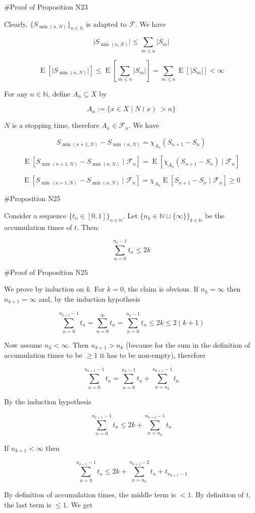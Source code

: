 \documentclass[a4paper]{article}
\DeclareMathOperator{\E}{E}
\newcommand{\Nats}{\mathbb{N}}
\newcommand{\Sq}[2]{\{#1\}_{#2 \in \Nats}}
\newcommand{\Sqn}[1]{\Sq{#1}{n}}
\newcommand{\Abs}[1]{\lvert #1 \rvert}
\newcommand{\F}{\mathcal{F}}
\begin{document}
\#Proof of Proposition N23

Clearly, ${\Sqn{S_{\min(n,N)}}}$ is adapted to ${\F}$. We have

$$\Abs{S_{\min(n,N)}} \leq \sum_{m \leq n} \Abs{S_m}$$

$$\E[\Abs{S_{\min(n,N)}}] \leq \E[\sum_{m \leq n} \Abs{S_m}] = \sum_{m \leq n} \E[\Abs{S_m}] < \infty$$

For any ${n \in \Nats}$, define ${A_n \subseteq X}$ by

$$A_n:=\{x \in X \mid N(x)\ > n\}$$

${N}$ is a stopping time, therefore ${A_n \in \F_n}$. We have 

$${S_{\min(n+1,N)} - S_{\min(n,N)} = \chi_{A_n} (S_{n+1} - S_n)}$$

$${\E[S_{\min(n+1,N)} - S_{\min(n,N)} \mid \F_n] = \E[\chi_{A_n} (S_{n+1} - S_n) \mid \F_n]}$$

$${\E[S_{\min(n+1,N)} - S_{\min(n,N)} \mid \F_n] = \chi_{A_n} \E[ S_{n+1} - S_n \mid \F_n] \geq 0}$$

\#Proposition N25

Consider a sequence ${\{t_n \in [0,1]\}_{n \in \Nats}}$. Let ${\{n_k \in \Nats \sqcup \{\infty\}\}_{k \in \Nats}}$ be the accumulation times of ${t}$. Then:

$$\sum_{n = 0}^{n_k - 1} t_n \leq 2k$$

\#Proof of Proposition N25

We prove by induction on ${k}$. For ${k = 0}$, the claim is obvious. If ${n_k = \infty}$ then ${n_{k+1}=\infty}$ and, by the induction hypothesis

$$\sum_{n = 0}^{n_{k+1} - 1} t_n = \sum_{n = 0}^{\infty} t_n = \sum_{n = 0}^{n_k - 1} t_n \leq 2k \leq 2(k+1)$$

Now assume ${n_k < \infty}$. Then ${n_{k+1} > n_k}$ (because for the sum in the definition of accumulation times to be ${\geq 1}$ it has to be non-empty), therefore

$$\sum_{n = 0}^{n_{k+1} - 1} t_n = \sum_{n = 0}^{n_k - 1} t_n + \sum_{n = n_k}^{n_{k+1} - 1} t_n$$

By the induction hypothesis

$$\sum_{n = 0}^{n_{k+1} - 1} t_n \leq 2k + \sum_{n = n_k}^{n_{k+1} - 1} t_n$$

If ${n_{k+1} < \infty}$ then

$$\sum_{n = 0}^{n_{k+1} - 1} t_n \leq 2k + \sum_{n = n_k}^{n_{k+1} - 2} t_n + t_{n_{k+1}-1}$$

By definition of accumulation times, the middle term is ${< 1}$. By definition of ${t}$, the last term is ${\leq 1}$. We get
\end{document}
